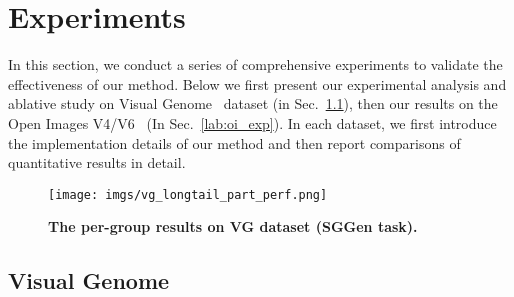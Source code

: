 
\section{Experiments}

In this section, we conduct a series of comprehensive experiments to validate the effectiveness of our method. Below we first present our experimental analysis and ablative study on Visual Genome~\cite{krishna2017visual} dataset (in Sec.~\ref{lab:vg_exp}), then our results on the Open Images V4/V6~\cite{OpenImages} (In Sec.~\ref{lab:oi_exp}). 
In each dataset, we first introduce the implementation details of our method and then report comparisons of quantitative results in detail.










\begin{figure}
    \centering
    \texttt{[image: imgs/vg\_longtail\_part\_perf.png]}
    \caption{\textbf{The per-group results on VG dataset (SGGen task).}} 
    \label{fig:vg_longtail_part_perf} 
    \vspace{-0.4cm}
\end{figure} 


\subsection{Visual Genome} \label{lab:vg_exp}

